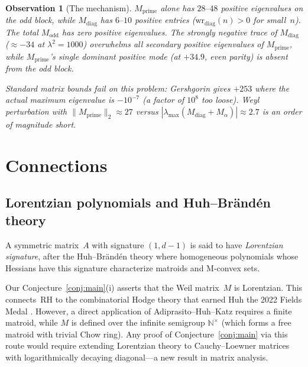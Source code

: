 \documentclass[11pt,a4paper]{article}
\newtheorem{observation}{Observation}[section]
\begin{document}
\begin{observation}[The mechanism]\label{obs:mechanism}
$M_{\mathrm{prime}}$ alone has $28\text{--}48$ positive eigenvalues on the odd block, while $M_{\mathrm{diag}}$ has $6\text{--}10$ positive entries ($\mathrm{wr}_{\mathrm{diag}}(n) > 0$ for small~$n$). The total $M_{\mathrm{odd}}$ has \emph{zero} positive eigenvalues. The strongly negative trace of $M_{\mathrm{diag}}$ ($\approx -34$ at $\lambda^2 = 1000$) overwhelms all secondary positive eigenvalues of $M_{\mathrm{prime}}$, while $M_{\mathrm{prime}}$'s single dominant positive mode (at $+34.9$, even parity) is absent from the odd block.

Standard matrix bounds fail on this problem: Gershgorin gives $+253$ where the actual maximum eigenvalue is $-10^{-7}$ (a factor of $10^8$ too loose). Weyl perturbation with $\|M_{\mathrm{prime}}\|_2 \approx 27$ versus $|\lambda_{\max}(M_{\mathrm{diag}} + M_{\alpha})| \approx 2.7$ is an order of magnitude short.
\end{observation}

\section{Connections}\label{sec:connections}

\subsection{Lorentzian polynomials and Huh--Br\"and\'en theory}

A symmetric matrix~$A$ with signature $(1, d-1)$ is said to have \emph{Lorentzian signature}, after the Huh--Br\"and\'en theory \cite{BH2020} where homogeneous polynomials whose Hessians have this signature characterize matroids and M-convex sets.

Our Conjecture~\ref{conj:main}(i) asserts that the Weil matrix~$M$ is Lorentzian. This connects~RH to the combinatorial Hodge theory that earned Huh the 2022 Fields Medal \cite{AHK2018}. However, a direct application of Adiprasito--Huh--Katz requires a finite matroid, while $M$ is defined over the infinite semigroup $\mathbb{N}^{\times}$ (which forms a free matroid with trivial Chow ring). Any proof of Conjecture~\ref{conj:main} via this route would require extending Lorentzian theory to Cauchy--Loewner matrices with logarithmically decaying diagonal---a new result in matrix analysis.
\end{document}
